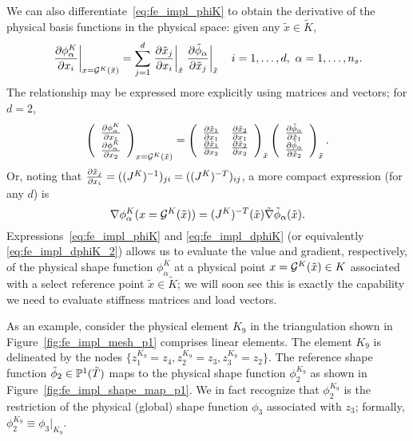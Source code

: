 We can also differentiate~\eqref{eq:fe_impl_phiK} to obtain the derivative of the physical basis functions in the physical space: given any $\tilde x \in \tilde K$, 
\begin{equation}
  \left. \pp{\phi^K_\alpha}{x_i} \right|_{x = \calG^K(\tilde x)} =
  \sum_{j=1}^{d} \left. \pp{\tilde x_j}{x_i} \right|_{\tilde x} \left. \pp{\tilde \phi_\alpha}{\tilde x_j} \right|_{\tilde x}  \quad i = 1,\dots,d, \ \alpha = 1,\dots,n_s.
  \label{eq:fe_impl_dphiK}
\end{equation}
The relationship may be expressed more explicitly using matrices and vectors; for $d = 2$,
\begin{equation*}
  \bmat{c}
  \pp{\phi_\alpha^K}{x_1} \\ \pp{\phi_\alpha^K}{x_2}
  \emat_{x = \calG^K(\tilde x)}
  =
  \bmat{cc}
  \pp{\tilde x_1}{x_1} & \pp{\tilde x_2}{x_1} \\
  \pp{\tilde x_1}{x_2} & \pp{\tilde x_2}{x_2}
  \emat_{\tilde x}
  \bmat{c}
  \pp{\tilde \phi_\alpha}{\tilde x_1} \\ \pp{\tilde \phi_\alpha}{\tilde x_2}
  \emat_{\tilde x}.
\end{equation*}
Or, noting that $\pp{\tilde x_j}{x_i} = ((J^K)^{-1})_{ji} = ((J^K)^{-T})_{ij}$, a more compact expression (for any $d$) is
\begin{equation}
  \nabla \phi_\alpha^K(x = \calG^K(\tilde x)) = (J^K)^{-T}(\tilde x) \tilde \nabla \tilde \phi_\alpha(\tilde x).
  \label{eq:fe_impl_dphiK_2}
\end{equation}
Expressions~\eqref{eq:fe_impl_phiK} and \eqref{eq:fe_impl_dphiK} (or equivalently \eqref{eq:fe_impl_dphiK_2}) allows us to evaluate the value and gradient, respectively, of the physical shape function $\phi^K_\alpha$ at a physical point $x = \calG^K(\tilde x) \in K$ associated with a select reference point $\tilde x \in \tilde K$; we will soon see this is exactly the capability we need to evaluate stiffness matrices and load vectors.

As an example, consider the physical element $K_9$ in the triangulation shown in Figure~\ref{fig:fe_impl_mesh_p1} comprises linear elements.  The element $K_9$ is delineated by the nodes $\{ z^{K_9}_1 = z_4, z^{K_9}_2 = z_3, z^{K_9}_3 = z_2 \}$. The reference shape function $\tilde \phi_2 \in \PP^1(\tilde T)$ maps to the physical shape function $\phi_2^{K_9}$ as shown in Figure~\ref{fig:fe_impl_shape_map_p1}.  We in fact recognize that $\phi_2^{K_9}$ is the restriction of the physical (global) shape function $\phi_3$ associated with $z_3$; formally, $\phi_2^{K_9} \equiv \phi_3|_{K_9}$. %



